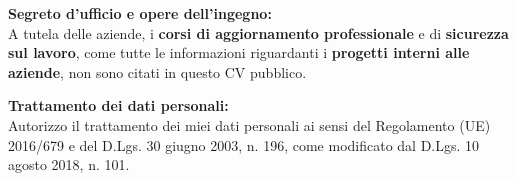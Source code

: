 
\par{
    \textbf{Segreto d'ufficio e opere dell'ingegno:}\\
    A tutela delle aziende, i \textbf{corsi di aggiornamento professionale} e di \textbf{sicurezza sul lavoro}, come tutte le informazioni riguardanti i \textbf{progetti interni alle aziende}, non sono citati in questo CV pubblico.
}

\par{
    \textbf{Trattamento dei dati personali:}\\
    Autorizzo il trattamento dei miei dati personali ai sensi del Regolamento (UE) 2016/679 e del D.Lgs. 30 giugno 2003, n. 196, come modificato dal D.Lgs. 10 agosto 2018, n. 101.
}
